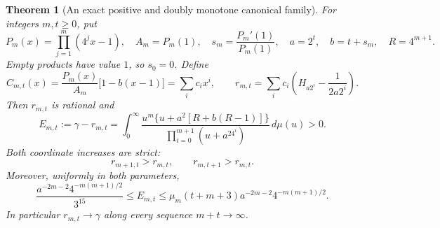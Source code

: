 \documentclass[11pt,a4paper]{article}
\newtheorem{theorem}{Theorem}[section]
\theoremstyle{definition}
\theoremstyle{remark}
\begin{document}
\begin{theorem}[An exact positive and doubly monotone canonical family]
\label{next-cutoff-canonical}
For integers $m,t\ge0$, put
\[
 P_m(x)=\prod_{j=1}^{m}(4^jx-1),\quad
 A_m=P_m(1),\quad s_m=\frac{P_m'(1)}{P_m(1)},\quad
 a=2^t,\quad b=t+s_m,\quad R=4^{m+1}.
\]
Empty products have value $1$, so $s_0=0$. Define
\[
 C_{m,t}(x)=\frac{P_m(x)}{A_m}\bigl[1-b(x-1)\bigr]
           =\sum_i c_i x^i,
 \qquad
 r_{m,t}=\sum_i c_i\left(H_{a2^i}-\frac1{2a2^i}\right).
\]
Then $r_{m,t}$ is rational and
\begin{equation}\label{next-cutoff-positive-kernel}
 E_{m,t}:=\gamma-r_{m,t}
 =\int_0^\infty
 \frac{u^m\{u+a^2[R+b(R-1)]\}}
      {\prod_{i=0}^{m+1}(u+a^24^i)}\,d\mu(u)>0.
\end{equation}
Both coordinate increases are strict:
\[
 r_{m+1,t}>r_{m,t},\qquad r_{m,t+1}>r_{m,t}.
\]
Moreover, uniformly in both parameters,
\begin{equation}\label{next-cutoff-two-sided}
 \frac{a^{-2m-2}4^{-m(m+1)/2}}{3^{15}}
 \le E_{m,t}
 \le \mu_m(t+m+3)a^{-2m-2}4^{-m(m+1)/2}.
\end{equation}
In particular $r_{m,t}\to\gamma$ along every sequence $m+t\to\infty$.
\end{theorem}
\end{document}

